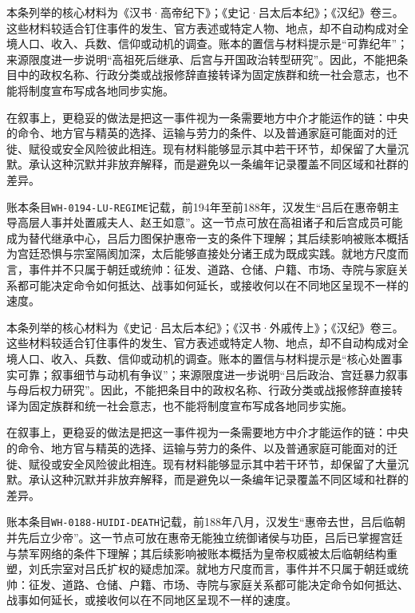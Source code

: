 本条列举的核心材料为《汉书·高帝纪下》；《史记·吕太后本纪》；《汉纪》卷三。这些材料较适合钉住事件的发生、官方表述或特定人物、地点，却不自动构成对全境人口、收入、兵数、信仰或动机的调查。账本的置信与材料提示是“可靠纪年”；来源限度进一步说明“高祖死后继承、后宫与开国政治转型研究”。因此，不能把条目中的政权名称、行政分类或战报修辞直接转译为固定族群和统一社会意志，也不能将制度宣布写成各地同步实施。

在叙事上，更稳妥的做法是把这一事件视为一条需要地方中介才能运作的链：中央的命令、地方官与精英的选择、运输与劳力的条件、以及普通家庭可能面对的迁徙、赋役或安全风险彼此相连。现有材料能够显示其中若干环节，却保留了大量沉默。承认这种沉默并非放弃解释，而是避免以一条编年记录覆盖不同区域和社群的差异。

账本条目\texttt{WH-0194-LU-REGIME}记载，前194年至前188年，汉发生“吕后在惠帝朝主导高层人事并处置戚夫人、赵王如意”。这一节点可放在高祖诸子和后宫成员可能成为替代继承中心，吕后力图保护惠帝一支的条件下理解；其后续影响被账本概括为宫廷恐惧与宗室隔阂加深，太后能够直接处分诸王成为既成实践。就地方尺度而言，事件并不只属于朝廷或统帅：征发、道路、仓储、户籍、市场、寺院与家庭关系都可能决定命令如何抵达、战事如何延长，或接收何以在不同地区呈现不一样的速度。

本条列举的核心材料为《史记·吕太后本纪》；《汉书·外戚传上》；《汉纪》卷三。这些材料较适合钉住事件的发生、官方表述或特定人物、地点，却不自动构成对全境人口、收入、兵数、信仰或动机的调查。账本的置信与材料提示是“核心处置事实可靠；叙事细节与动机有争议”；来源限度进一步说明“吕后政治、宫廷暴力叙事与母后权力研究”。因此，不能把条目中的政权名称、行政分类或战报修辞直接转译为固定族群和统一社会意志，也不能将制度宣布写成各地同步实施。

在叙事上，更稳妥的做法是把这一事件视为一条需要地方中介才能运作的链：中央的命令、地方官与精英的选择、运输与劳力的条件、以及普通家庭可能面对的迁徙、赋役或安全风险彼此相连。现有材料能够显示其中若干环节，却保留了大量沉默。承认这种沉默并非放弃解释，而是避免以一条编年记录覆盖不同区域和社群的差异。

账本条目\texttt{WH-0188-HUIDI-DEATH}记载，前188年八月，汉发生“惠帝去世，吕后临朝并先后立少帝”。这一节点可放在惠帝无能独立统御诸侯与功臣，吕后已掌握宫廷与禁军网络的条件下理解；其后续影响被账本概括为皇帝权威被太后临朝结构重塑，刘氏宗室对吕氏扩权的疑虑加深。就地方尺度而言，事件并不只属于朝廷或统帅：征发、道路、仓储、户籍、市场、寺院与家庭关系都可能决定命令如何抵达、战事如何延长，或接收何以在不同地区呈现不一样的速度。

